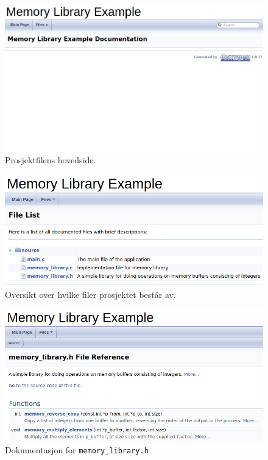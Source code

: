 \begin{alphasection}
\begin{figure}[ht]
    \centering
    \includegraphics[width=135mm]{figures/doxygen-main.png}
    \caption{Prosjektfilens hovedside.}
    \label{fig:2-dox-fig-main}
\end{figure}

\begin{figure}[ht]
    \centering
    \includegraphics[width=131mm]{figures/doxygenfil1.png}
    \caption{Oversikt over hvilke filer prosjektet består av.}
    \label{fig:2-dox-fig}
\end{figure}


\begin{figure}[H]
    \centering
    \includegraphics[width=131mm]{figures/doxygenfil2.png}
    \caption{Dokumentasjon for \texttt{memory\_library.h}}
    \label{fig:2-dox-fig2}
\end{figure}


\end{alphasection}
